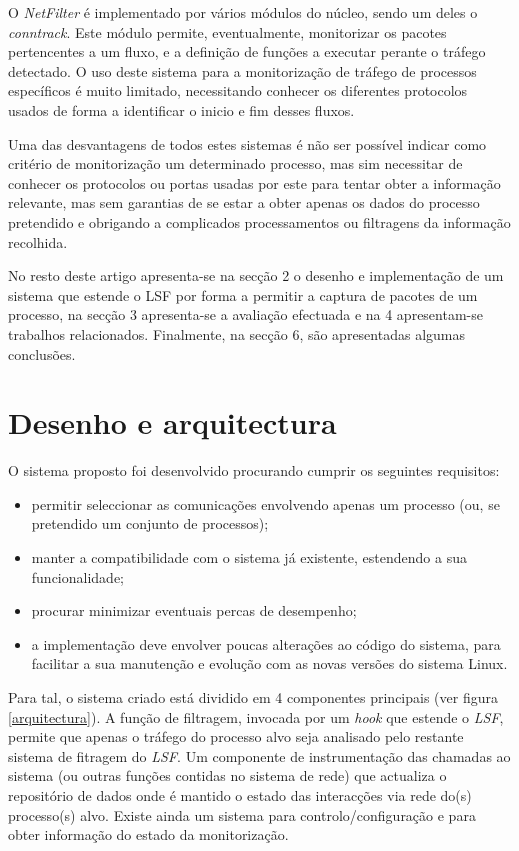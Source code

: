 \documentclass[a4paper]{llncs}
\begin{document}
O \textit{NetFilter} é implementado por vários módulos do núcleo, sendo um deles o \textit{conntrack}\cite{CTS}.
 Este módulo permite, eventualmente, monitorizar os pacotes pertencentes a um fluxo, e a definição de funções a executar perante o tráfego detectado.
 O uso deste sistema para a monitorização de tráfego de processos específicos é muito limitado, necessitando conhecer os diferentes protocolos usados de forma a identificar o inicio e fim desses fluxos. 


Uma das desvantagens de todos estes sistemas é não ser possível indicar como critério de monitorização um determinado processo, mas sim necessitar de conhecer os protocolos ou portas usadas por este para tentar obter a informação relevante, mas sem garantias de se estar a obter apenas os dados do processo pretendido e obrigando a complicados processamentos ou filtragens da informação recolhida.

No resto deste artigo apresenta-se na secção 2 o desenho e implementação de um sistema que estende o LSF por forma a permitir a captura de pacotes de um processo, na secção 3 apresenta-se a avaliação efectuada e na 4 apresentam-se trabalhos relacionados. Finalmente, na secção 6, são apresentadas algumas conclusões.

\section{Desenho e arquitectura}
\label{sec:architecture}

O sistema proposto foi desenvolvido procurando cumprir os seguintes requisitos:
\begin{itemize}
\item permitir seleccionar as comunicações envolvendo apenas um processo (ou, se pretendido um conjunto de processos);
\item manter a compatibilidade com o sistema já existente, estendendo a sua funcionalidade;
\item procurar minimizar eventuais percas de desempenho;
\item a implementação deve envolver poucas alterações ao código do sistema, para facilitar a sua manutenção e evolução com as novas versões do sistema Linux.
\end{itemize}

Para tal, o sistema criado está dividido em 4 componentes principais (ver figura \ref{arquitectura}).
 A função de filtragem, invocada por um \textit{hook} que estende o \textit{LSF}, permite que apenas o tráfego do processo alvo seja analisado pelo restante sistema de fitragem do \textit{LSF}.
 Um componente de instrumentação das chamadas ao sistema (ou outras funções contidas no sistema de rede) que actualiza o repositório de dados onde é mantido o estado das interacções via rede do(s) processo(s) alvo. Existe ainda um sistema para controlo/configuração e para obter informação do estado da monitorização.
\end{document}
